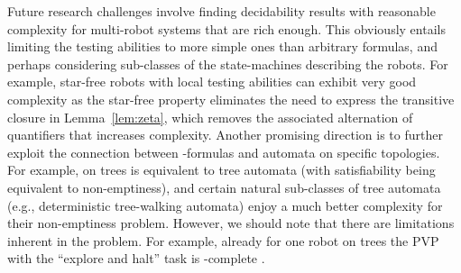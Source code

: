 Future research challenges involve finding decidability results with reasonable complexity for multi-robot systems that are rich enough. This obviously entails limiting the testing abilities to more simple ones than arbitrary \msol formulas, and perhaps considering sub-classes of the state-machines describing the robots. For example, star-free robots with local testing abilities can exhibit very good complexity as the star-free property eliminates the need to express the transitive closure in Lemma~\ref{lem:zeta}, which removes the associated alternation of quantifiers that increases complexity. Another promising direction is to further exploit the connection between \msol-formulas and automata on specific topologies. For example, \msol on trees is equivalent to tree automata (with satisfiability being equivalent to non-emptiness), and certain natural sub-classes of tree automata (e.g., deterministic tree-walking automata) enjoy a much better complexity for their non-emptiness problem. However, we should note that there are limitations inherent in the problem. For example, already for one robot on trees the PVP with the ``explore and halt'' task is \exptime-complete \cite{Rubin15AAMAS}.


